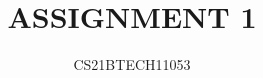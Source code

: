 \documentclass[journal,12pt,twocolumn]{IEEEtran}
\begin{document}
\makeatletter
{}
\makeatother
\let\StandardTheFigure\thefigure
\let\vec\mathbf
\renewcommand{\thefigure}{\theproblem}

\title{ASSIGNMENT 1}
\author{CS21BTECH11053}

%
%
%
% 
%
\end{document}
